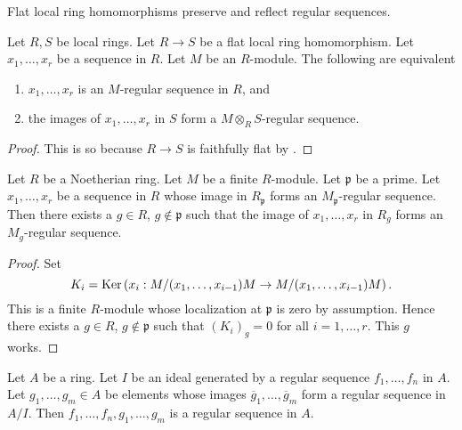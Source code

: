 \begin{lemma}\cite[\href{https://stacks.math.columbia.edu/tag/00LM}{Lemma 00LM}]{stacks-project}
	\label{lemma-flat-increases-depth}
	\begin{slogan}
		Flat local ring homomorphisms preserve and reflect regular sequences.
	\end{slogan}
	Let $R, S$ be local rings. Let $R \to S$ be a flat local ring homomorphism.
	Let $x_1, \ldots, x_r$ be a sequence in $R$. Let $M$ be an $R$-module.
	The following are equivalent
	\begin{enumerate}
		\item $x_1, \ldots, x_r$ is an $M$-regular sequence in $R$, and
		\item the images of $x_1, \ldots, x_r$ in $S$ form a $M \otimes_R S$-regular
		sequence.
	\end{enumerate}
\end{lemma}

\begin{proof}
	This is so because $R \to S$ is faithfully flat
	by \cite[\href{https://stacks.math.columbia.edu/tag/00HR}{Lemma 00HR}]{stacks-project}.
\end{proof}

\begin{lemma}\cite[\href{https://stacks.math.columbia.edu/tag/061L}{Lemma 061L}]{stacks-project}
	\label{lemma-regular-sequence-in-neighbourhood}
	Let $R$ be a Noetherian ring. Let $M$ be a finite $R$-module.
	Let $\mathfrak p$ be a prime. Let $x_1, \ldots, x_r$ be a sequence
	in $R$ whose image in $R_{\mathfrak p}$ forms an $M_{\mathfrak p}$-regular
	sequence. Then there exists a $g \in R$, $g \not \in \mathfrak p$
	such that the image of $x_1, \ldots, x_r$ in $R_g$ forms
	an $M_g$-regular sequence.
\end{lemma}

\begin{proof}
	Set
	$$
	K_i = \mathop{\mathrm{Ker}}\left(x_i : M/(x_1, \ldots, x_{i - 1})M \to
	M/(x_1, \ldots, x_{i - 1})M\right).
	$$
	This is a finite $R$-module whose localization at $\mathfrak p$ is
	zero by assumption. Hence there exists a $g \in R$, $g \not \in \mathfrak p$
	such that $(K_i)_g = 0$ for all $i = 1, \ldots, r$. This $g$ works.
\end{proof}

\begin{lemma}\cite[\href{https://stacks.math.columbia.edu/tag/065K}{Lemma 065K}]{stacks-project}
	\label{lemma-join-regular-sequences}
	Let $A$ be a ring. Let $I$ be an ideal generated by a regular
	sequence $f_1, \ldots, f_n$ in $A$. Let $g_1, \ldots, g_m \in A$ be
	elements whose images $\overline{g}_1, \ldots, \overline{g}_m$ form a
	regular sequence in $A/I$. Then $f_1, \ldots, f_n, g_1, \ldots, g_m$
	is a regular sequence in $A$.
\end{lemma}

